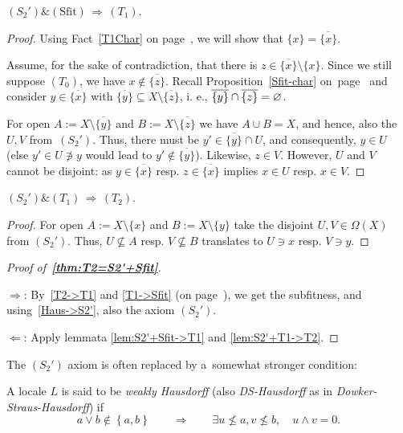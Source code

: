 \begin{lem} \label{lem:S2'+Sfit->T1}
  $(S_2') \& (\text{Sfit}) \, \Rightarrow \, (T_1)$.
\end{lem}
\begin{proof}
  Using Fact~\ref{T1Char} on page~\pageref{T1Char}, we will show that $\{ x \}
  = \overline{\{ x \}}$.

  Assume, for the sake of contradiction, that there is $z\in \overline{\{ x \}}
  \setminus \{ x \}$.
  Since we still suppose $(T_0)$, we have $x\not\in \overline{\{ z \}}$.
  Recall Proposition~\ref{Sfit-char} on~page~\pageref{Sfit-char} and consider
  $y\in \overline{\{x\}}$ with $\overline{\{y\}} \subseteq X\setminus
  \overline{\{ z \}}$, i. e., $\overline{\{ y \}} \cap \overline{\{ z \}} =
  \varnothing$.

  For open $A := X \setminus \overline{\{ y \}}$ and $B := X \setminus
  \overline{\{ z \}}$ we have $A \cup B = X$, and hence, also the $U, V$
  from~$(S_2')$.
  Thus, there must be $y'\in \overline{\{ y \}} \cap U$, and consequently,
  $y\in U$ (else $y'\in U\not\owns y$ would lead to $y'\not\in \overline{\{ y
  \}}$).
  Likewise, $z\in V$.
  However, $U$ and $V$ cannot be disjoint:
  as $y\in \overline{\{ x \}}$ resp. $z\in \overline{\{ x \}}$ implies $x\in U$
  resp. $x\in V$.
\end{proof}

\begin{lem} \label{lem:S2'+T1->T2}
  $(S_2') \& (T_1) \, \Rightarrow \, (T_2)$.
\end{lem}
\begin{proof}
  For open $A := X\setminus \{ x \}$ and $B := X\setminus \{ y \}$ take the
  disjoint $U, V\in \Omega(X)$ from $(S_2')$.
  Thus, $U\not\subseteq A$ resp. $V\not\subseteq B$ translates to $U\owns x$
  resp. $V\owns y$.
\end{proof}

\begin{proof}[Proof of~{\bf\ref{thm:T2=S2'+Sfit}}]
  ~

  $\Rightarrow$:
  By~\ref{T2->T1} and \ref{T1->Sfit} (on page~\pageref{T1->Sfit}), we get the
  subfitness, and using~\ref{Haus->S2'}, also the axiom $(S_2')$.

  $\Leftarrow$:
  Apply lemmata \ref{lem:S2'+Sfit->T1} and \ref{lem:S2'+T1->T2}.
\end{proof}

The $(S_2')$ axiom is often replaced by a~somewhat stronger condition:

\begin{framed}
  \begin{df}[DS-Haus]
    A locale $L$ is said to be \emph{weakly Hausdorff\/} (also
    \emph{DS-Hausdorff} as in \emph{Dowker-Straus-Hausdorff}) if
    \[
      a \vee b \not\in \left\{a, b\right\} \qquad \Rightarrow \qquad \exists
      u\not\leq a, v\not\leq b, \quad u \wedge v = 0.
    \]
  \end{df}
\end{framed}


